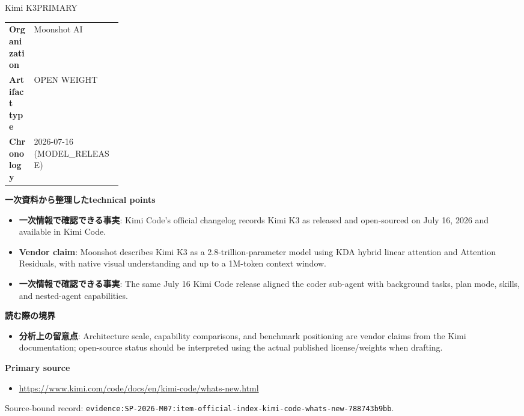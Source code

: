 \begin{technicalnote}{Kimi K3}{PRIMARY}
\begin{tabularx}{\linewidth}{@{}>{\bfseries}p{0.22\linewidth}X@{}}
Organization & Moonshot AI \\
Artifact type & OPEN WEIGHT \\
Chronology & 2026-07-16 (MODEL\_RELEASE) \\
\end{tabularx}
\smallskip
{\bfseries 一次資料から整理したtechnical points}
\begin{itemize}[leftmargin=1.5em,itemsep=0.35em]
\item \textbf{一次情報で確認できる事実}: Kimi Code's official changelog records Kimi K3 as released and open-sourced on July 16, 2026 and available in Kimi Code.
\item \textbf{Vendor claim}: Moonshot describes Kimi K3 as a 2.8-trillion-parameter model using KDA hybrid linear attention and Attention Residuals, with native visual understanding and up to a 1M-token context window.
\item \textbf{一次情報で確認できる事実}: The same July 16 Kimi Code release aligned the coder sub-agent with background tasks, plan mode, skills, and nested-agent capabilities.
\end{itemize}
{\bfseries 読む際の境界}
\begin{itemize}[leftmargin=1.5em,itemsep=0.35em]
\item \textbf{分析上の留意点}: Architecture scale, capability comparisons, and benchmark positioning are vendor claims from the Kimi documentation; open-source status should be interpreted using the actual published license/weights when drafting.
\end{itemize}
{\bfseries Primary source}
\begingroup\sloppy
\begin{itemize}[leftmargin=1.5em,itemsep=0.25em]
\item {\scriptsize\url{https://www.kimi.com/code/docs/en/kimi-code/whats-new.html}}
\end{itemize}
\endgroup
{\scriptsize\color{SurveyMuted}Source-bound record: \texttt{evidence:SP-2026-M07:item-official-index-kimi-code-whats-new-788743b9bb}.}
\end{technicalnote}
\medskip
